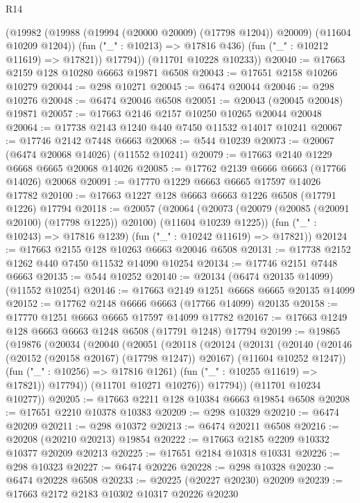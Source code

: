 \begin{lexlean}{R14}
\begin{coremodule}
            (@19982 (@19988 (@19994 (@20000 @20009) (@17798 @1204)) @20009) (@11604 @10209 @1204))
            (fun ("_" : @10213) => @17816 @436)
            (fun ("_" : @10212 @11619) => @17821))
          @17794))
      (@11701 @10228 @10233))
@20040 := @17663 @2159 @128 @10280 @6663 @19871 @6508
@20043 := @17651 @2158 @10266 @10279
@20044 := @298 @10271
@20045 := @6474 @20044
@20046 := @298 @10276
@20048 := @6474 @20046 @6508
@20051 := @20043 (@20045 @20048) @19871
@20057 := @17663 @2146 @2157 @10250 @10265 @20044 @20048
@20064 := @17738 @2143 @1240 @440 @7450 @11532 @14017 @10241
@20067 := @17746 @2142 @7448 @6663
@20068 := @544 @10239
@20073 := @20067 (@6474 @20068 @14026) (@11552 @10241)
@20079 := @17663 @2140 @1229 @6668 @6665 @20068 @14026
@20085 := @17762 @2139 @6666 @6663 (@17766 @14026) @20068
@20091 := @17770 @1229 @6663 @6665 @17597 @14026 @17782
@20100 := @17663 @1227 @128 @6663 @6663 @1226 @6508 (@17791 @1226) @17794
@20118 := @20057
    (@20064
      (@20073 (@20079 (@20085 (@20091 @20100) (@17798 @1225)) @20100) (@11604 @10239 @1225))
      (fun ("_" : @10243) => @17816 @1239)
      (fun ("_" : @10242 @11619) => @17821))
@20124 := @17663 @2155 @128 @10263 @6663 @20046 @6508
@20131 := @17738 @2152 @1262 @440 @7450 @11532 @14090 @10254
@20134 := @17746 @2151 @7448 @6663
@20135 := @544 @10252
@20140 := @20134 (@6474 @20135 @14099) (@11552 @10254)
@20146 := @17663 @2149 @1251 @6668 @6665 @20135 @14099
@20152 := @17762 @2148 @6666 @6663 (@17766 @14099) @20135
@20158 := @17770 @1251 @6663 @6665 @17597 @14099 @17782
@20167 := @17663 @1249 @128 @6663 @6663 @1248 @6508 (@17791 @1248) @17794
@20199 := @19865
    (@19876
      (@20034
        (@20040
          (@20051
            (@20118
              (@20124
                (@20131
                  (@20140
                    (@20146 (@20152 (@20158 @20167) (@17798 @1247)) @20167)
                    (@11604 @10252 @1247))
                  (fun ("_" : @10256) => @17816 @1261)
                  (fun ("_" : @10255 @11619) => @17821))
                @17794))
            (@11701 @10271 @10276))
          @17794))
      (@11701 @10234 @10277))
@20205 := @17663 @2211 @128 @10384 @6663 @19854 @6508
@20208 := @17651 @2210 @10378 @10383
@20209 := @298 @10329
@20210 := @6474 @20209
@20211 := @298 @10372
@20213 := @6474 @20211 @6508
@20216 := @20208 (@20210 @20213) @19854
@20222 := @17663 @2185 @2209 @10332 @10377 @20209 @20213
@20225 := @17651 @2184 @10318 @10331
@20226 := @298 @10323
@20227 := @6474 @20226
@20228 := @298 @10328
@20230 := @6474 @20228 @6508
@20233 := @20225 (@20227 @20230) @20209
@20239 := @17663 @2172 @2183 @10302 @10317 @20226 @20230

\end{coremodule}
\end{lexlean}
